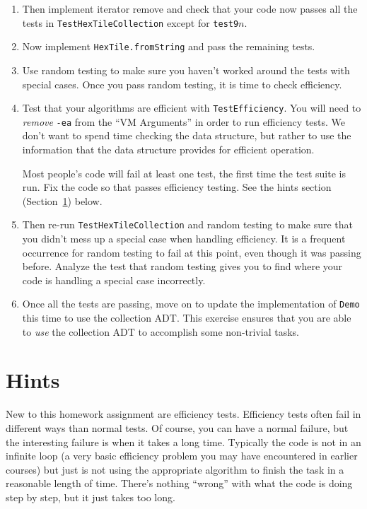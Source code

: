 \documentclass[11pt]{article}
\begin{document}
\begin{enumerate}
\item Then implement iterator remove and check that your code now
  passes all the tests in \texttt{TestHexTileCollection} except for
  \texttt{test9}$n$.

\item Now implement \texttt{HexTile.fromString} and pass the remaining tests.
  
\item Use random testing to make sure you haven't worked around
  the tests with special cases.  Once you pass random testing, it
  is time to check efficiency.
  
\item Test that your algorithms are efficient with
  \texttt{TestEfficiency}.  You will need to \emph{remove}
  \texttt{-ea} from the ``VM Arguments'' in order to run
  efficiency tests.  We don't want to spend time checking the data
  structure, but rather to use the information that the data structure
  provides for efficient operation.

  Most people's code will fail at least one test, the
  first time the test suite is run.  Fix the code so that passes efficiency
  testing.  See the hints section (Section~\ref{sec:hints}) below.

\item Then re-run \texttt{TestHexTileCollection} and random testing to
  make sure that you didn't mess up
  a special case when handling efficiency.  It is a frequent occurrence
  for random testing to fail at this point, even though it was passing
  before.  Analyze the test that random testing gives you to find
  where your code is handling a special case incorrectly.
  
\item Once all the tests are passing, move on to update the
  implementation of \texttt{Demo} this time to use the collection
  ADT.  This exercise ensures that you are able to \emph{use} the
  collection ADT to accomplish some non-trivial tasks.
\end{enumerate}  

\section{Hints}\label{sec:hints}

New to this homework assignment are efficiency tests.
Efficiency tests often fail in different ways than normal tests.  Of
course, you can have a normal failure, but the interesting failure is
when it takes a long time.  Typically the code is not in an infinite
loop (a very basic efficiency problem you may have encountered in
earlier courses) but just is not using the appropriate algorithm to
finish the task in a reasonable length of time.  There's nothing
``wrong'' with what the code is doing step by step, but it just
takes too long.
\end{document}
